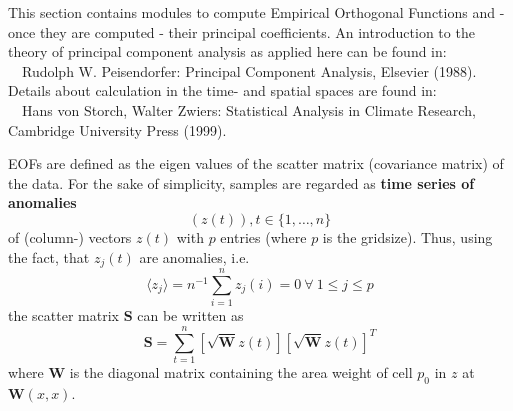 This section contains modules to compute Empirical Orthogonal Functions and 
- once they are computed - their principal coefficients. An introduction to the theory 
of principal component analysis as applied here can be found in:\\ 
~~Rudolph W. Peisendorfer: Principal Component Analysis, Elsevier (1988).\\
Details about calculation in the time- and spatial spaces are found in:\\
~~Hans von Storch, Walter Zwiers: Statistical Analysis in Climate Research, 
   Cambridge University Press (1999).

EOFs are defined as the eigen values of the scatter matrix (covariance matrix) of
the data. For the sake of simplicity, samples are regarded as {\bf time series of anomalies}
\begin{displaymath}
\left(z(t)\right), t\in\{1,\ldots,n\}
\end{displaymath}
of (column-) vectors \(z(t)\) with \(p\) entries (where \(p\) is the gridsize). 
Thus, using the fact, that \(z_j(t)\) are anomalies, i.e.
\begin{displaymath}
\langle z_j\rangle=n^{-1}\sum_{i=1}^{n}z_j(i)=0~\forall~1\le j \le p
\end{displaymath} the scatter matrix \(\mathbf{S}\) can be written as
\begin{displaymath}
\mathbf{S} = \sum_{t=1}^{n} \left[\sqrt{\mathbf{W}}z(t)\right]\left[\sqrt{\mathbf{W}}z(t)\right]^T
\end{displaymath}
where \(\mathbf{W}\) is the diagonal matrix containing the area weight of cell \(p_0\) 
in \(z\) at \(\mathbf{W}(x,x)\).

